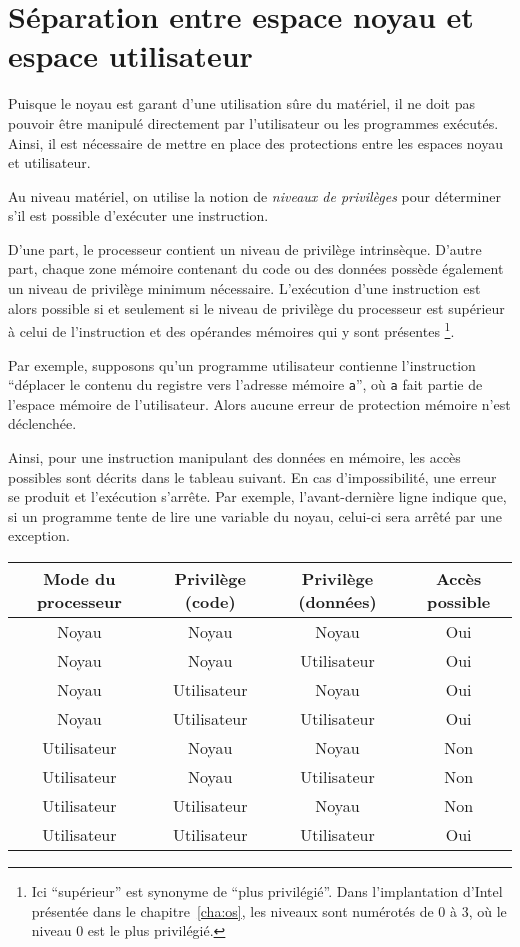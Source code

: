 \section{Séparation entre espace noyau et espace utilisateur}
\label{sec:sep-esp}

Puisque le noyau est garant d'une utilisation sûre du matériel, il ne doit pas
pouvoir être manipulé directement par l'utilisateur ou les programmes exécutés.
Ainsi, il est nécessaire de mettre en place des protections entre les espaces
noyau et utilisateur.

Au niveau matériel, on utilise la notion de \emph{niveaux de privilèges} pour
déterminer s'il est possible d'exécuter une instruction.

D'une part, le processeur contient un niveau de privilège intrinsèque. D'autre
part, \linebreak chaque zone mémoire contenant du code ou des données possède
également un niveau de privilège minimum nécessaire. L'exécution d'une
instruction est alors possible si et seulement si le niveau de privilège du
processeur est supérieur à celui de l'instruction et des opérandes mémoires qui
y sont présentes
\footnote{
  Ici \enquote{supérieur} est synonyme de \enquote{plus privilégié}. Dans l'implantation
  d'Intel présentée dans le chapitre~\ref{cha:os}, les niveaux sont numérotés de
  0 à 3, où le niveau 0 est le plus privilégié.
}.

Par exemple, supposons qu'un programme utilisateur contienne l'instruction
\enquote{déplacer le contenu du registre \eax{} vers l'adresse mémoire
\texttt{a}}, où \texttt{a} fait partie de l'espace mémoire de l'utilisateur.
Alors aucune erreur de protection mémoire n'est déclenchée.

Ainsi, pour une instruction manipulant des données en mémoire, les accès
possibles sont décrits dans le tableau suivant. En cas d'impossibilité, une
erreur se produit et l'exécution s'arrête. Par exemple, l'avant-dernière ligne
indique que, si un programme tente de lire une variable du noyau, celui-ci sera
arrêté par une exception.

\begin{center}
\def\modeK{Noyau\xspace}
\def\modeU{Utilisateur\xspace}
\begin{tabular}{cccc}
\toprule
  Mode du processeur
& Privilège (code)
& Privilège (données)
& Accès possible \\
\midrule
  \modeK{} & \modeK{} & \modeK{} & Oui \\
  \modeK{} & \modeK{} & \modeU{} & Oui \\
  \modeK{} & \modeU{} & \modeK{} & Oui \\
  \modeK{} & \modeU{} & \modeU{} & Oui \\
  \modeU{} & \modeK{} & \modeK{} & Non \\
  \modeU{} & \modeK{} & \modeU{} & Non \\
  \modeU{} & \modeU{} & \modeK{} & Non \\
  \modeU{} & \modeU{} & \modeU{} & Oui \\
\bottomrule
\end{tabular}
\end{center}
\label{page:erreursec}

